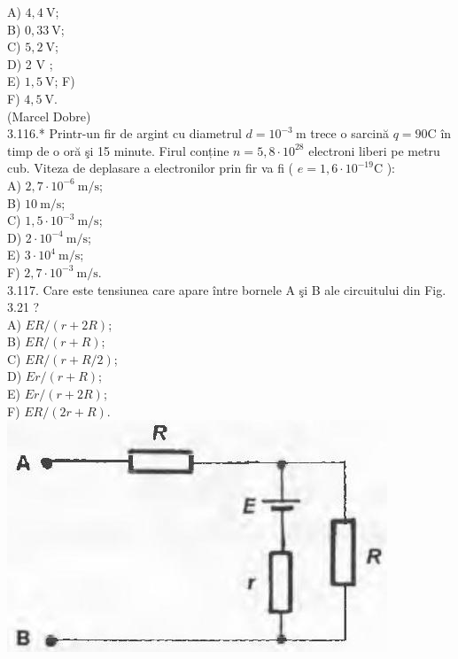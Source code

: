 \documentclass[10pt]{article}
\begin{document}
A) $4,4 \mathrm{~V}$;\\
B) $0,33 \mathrm{~V}$;\\
C) $5,2 \mathrm{~V}$;\\
D) 2 V ;\\
E) $1,5 \mathrm{~V}$; F)\\
F) $4,5 \mathrm{~V}$.\\
(Marcel Dobre)\\
3.116.* Printr-un fir de argint cu diametrul $d=10^{-3} \mathrm{~m}$ trece o sarcină $q=90 \mathrm{C}$ în timp de o oră şi 15 minute. Firul conține $n=5,8 \cdot 10^{28}$ electroni liberi pe metru cub. Viteza de deplasare a electronilor prin fir va fi ( $e=1,6 \cdot 10^{-19} \mathrm{C}$ ):\\
A) $2,7 \cdot 10^{-6} \mathrm{~m} / \mathrm{s}$;\\
B) $10 \mathrm{~m} / \mathrm{s}$;\\
C) $1,5 \cdot 10^{-3} \mathrm{~m} / \mathrm{s}$;\\
D) $2 \cdot 10^{-4} \mathrm{~m} / \mathrm{s}$;\\
E) $3 \cdot 10^{4} \mathrm{~m} / \mathrm{s}$;\\
F) $2,7 \cdot 10^{-3} \mathrm{~m} / \mathrm{s}$.\\
3.117. Care este tensiunea care apare între bornele A şi B ale circuitului din Fig. 3.21 ?\\
A) $E R /(r+2 R)$;\\
B) $E R /(r+R)$;\\
C) $E R /(r+R / 2)$;\\
D) $E r /(r+R)$;\\
E) $E r /(r+2 R)$;\\
F) $E R /(2 r+R)$.\\
\includegraphics[max width=\textwidth, center]{2025_07_01_5b3ff9fa0d508c8e9f17g-169}
\end{document}

